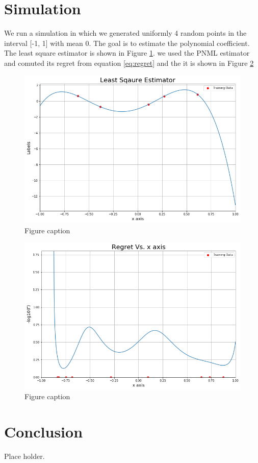\documentclass[final,1p,times]{elsarticle}
\begin{document}
\section{Simulation} \label{sec:Simulation}
We run a simulation in which we generated uniformly 4 random points in the interval [-1, 1] with mean 0. The goal is to estimate the polynomial coefficient. The least square estimator is shown in Figure \ref{fig:least_sqaures}. we used the PNML estimator and comuted its regret from equation \ref{eq:regret} and the it is shown in Figure \ref{fig:regret} 
\begin{figure}[h] \label{fig:least_sqaures}
\centering\includegraphics[width=0.8\linewidth]{least_sqaures.png}
\caption{Figure caption}
\end{figure}

\begin{figure}[h] \label{fig:regret}
\centering\includegraphics[width=0.8\linewidth]{regret_plot.png}
\caption{Figure caption}
\end{figure}

\section{Conclusion} \label{sec:Conclusion}
Place holder.





\end{document}
